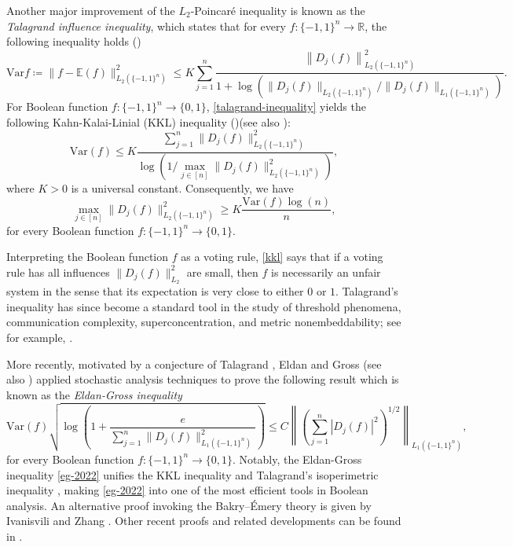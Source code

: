 \documentclass{amsbook}
\theoremstyle{definition}
\theoremstyle{remark}
\numberwithin{section}{chapter}
\numberwithin{equation}{chapter}
\newcommand{\1}{\mathbf{1}}
\newcommand{\R}{\mathbb{R}}
\newcommand{\var}{\mathrm{Var}}
\begin{document}
Another major improvement of the $L_2$-Poincar\'e inequality is known as the \emph{Talagrand influence inequality}, which states that  for every $f:\{-1,1\}^{n}\to \R$, the following inequality holds (\cite{Ta1994})
\begin{equation}\label{talagrand-inequality}
\var{f}\coloneqq \|f-\mathbb{E}(f)\|_{L_2(\{-1,1\}^{n})}^2\leq K\sum\limits_{j=1}^{n}\frac{\left\|D_{j}(f)\right\|_{L_2(\{-1,1\}^{n})}^{2}}{1+\log\left(\|D_{j}(f)\|_{L_2(\{-1,1\}^{n})}/\|D_{j}(f)\|_{L_1(\{-1,1\}^{n})}\right)}.
\end{equation}
For Boolean function $f:\{-1,1\}^{n}\to \{0,1\}$, \eqref{talagrand-inequality} yields the following Kahn-Kalai-Linial (KKL) inequality (\cite{KKL1988})(see also \cite{KKKMS2021, Ta1994}):
\begin{equation}\label{functional-kkl}
\var(f)\leq K\frac{\sum_{j=1}^{n}\|D_{j}(f)\|^{2}_{L_{2}(\{-1,1\}^{n})}}{\log\left(1/\max_{j\in [n]}\|D_{j}(f)\|^{2}_{L_{2}(\{-1,1\}^{n})}\right)},
\end{equation}
where $K>0$ is a universal constant. Consequently, we have
\begin{equation}\label{kkl}
\max_{j\in[n]}\|D_j(f)\|_{L_2(\{-1,1\}^{n})}^2\geq K\frac{\var(f)\log(n)}{n},
\end{equation}
for every Boolean function  $f:\{-1,1\}^{n}\to \{0,1\}$.

Interpreting the Boolean function $f$ as a voting rule, \eqref{kkl} says that if a voting
rule has all influences $\|D_j(f)\|_{L_2}^2$ are small, then $f$ is necessarily an unfair system in the sense that its expectation is very close to either $0$ or $1$. Talagrand's inequality has since become a standard tool in the study of threshold phenomena, communication complexity, superconcentration, and metric nonembeddability; see for example, \cite{Cha2014, CEE2020, EG2020, KMS2014, KR2009, OW2013}.


More recently, motivated by a conjecture of Talagrand \cite{Ta1997}, Eldan and Gross \cite{EG2020} (see also \cite{EG2022}) applied stochastic analysis techniques to prove the following result which is known as the \emph{Eldan-Gross inequality}
\begin{equation}\label{eg-2022}
\var(f)\sqrt{\log\left(1+\frac{e}{\sum_{j=1}^{n}\|D_{j}(f)\|^{2}_{L_1(\{-1,1\}^{n})}}\right)}\leq C\left\|\left(\sum_{j=1}^{n}|D_{j}(f)|^{2}\right)^{1/2}\right\|_{L_1(\{-1,1\}^{n})},
\end{equation}
for every Boolean function $f:\{-1,1\}^{n}\to\{0,1\}$. Notably, the Eldan-Gross inequality \eqref{eg-2022} unifies the KKL inequality  and Talagrand's isoperimetric inequality \cite[Theorem 1.1]{Ta1993}, making \eqref{eg-2022} into one of the most efficient tools in Boolean analysis. An alternative proof invoking the Bakry--\'Emery theory is given by Ivanisvili and Zhang \cite{IZ2026}. Other recent proofs and related developments can be found in \cite{BIM2023,EKLM2022,Ros2020}.
\end{document}
